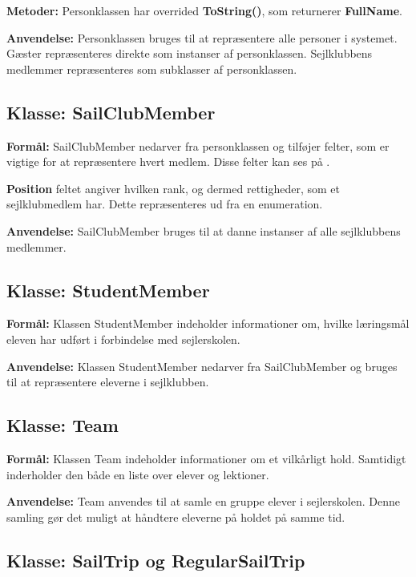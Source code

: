 \textbf{Metoder:}
Personklassen har overrided \textbf{ToString()}, som returnerer \textbf{FullName}.

\textbf{Anvendelse:}
Personklassen bruges til at repræsentere alle personer i systemet. 
Gæster repræsenteres direkte som instanser af personklassen. 
Sejlklubbens medlemmer repræsenteres som subklasser af personklassen. 

\subsection*{Klasse: SailClubMember}

\textbf{Formål:}
SailClubMember nedarver fra personklassen og tilføjer felter, som er vigtige for at repræsentere hvert medlem.
Disse felter kan ses på .

\textbf{Position} feltet angiver hvilken rank, og dermed rettigheder, som et sejlklubmedlem har. 
Dette repræsenteres ud fra en enumeration.

\textbf{Anvendelse:}
SailClubMember bruges til at danne instanser af alle sejlklubbens medlemmer. 

\subsection*{Klasse: StudentMember}
\textbf{Formål:}
Klassen StudentMember indeholder informationer om, hvilke læringsmål eleven har udført i forbindelse med sejlerskolen. 

\textbf{Anvendelse:}
Klassen StudentMember nedarver fra SailClubMember og bruges til at repræsentere eleverne i sejlklubben.

\subsection*{Klasse: Team}

\textbf{Formål:}
Klassen Team indeholder informationer om et vilkårligt hold. 
Samtidigt inderholder den både en liste over elever og lektioner.

\textbf{Anvendelse:}
Team anvendes til at samle en gruppe elever i sejlerskolen.
Denne samling gør det muligt at håndtere eleverne på holdet på samme tid.

\subsection*{Klasse: SailTrip og RegularSailTrip}

